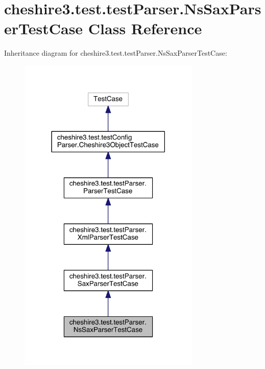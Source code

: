\hypertarget{classcheshire3_1_1test_1_1test_parser_1_1_ns_sax_parser_test_case}{\section{cheshire3.\-test.\-test\-Parser.\-Ns\-Sax\-Parser\-Test\-Case Class Reference}
\label{classcheshire3_1_1test_1_1test_parser_1_1_ns_sax_parser_test_case}
}


Inheritance diagram for cheshire3.\-test.\-test\-Parser.\-Ns\-Sax\-Parser\-Test\-Case\-:
\nopagebreak
\begin{figure}[H]
\begin{center}
\leavevmode
\includegraphics[width=246pt]{classcheshire3_1_1test_1_1test_parser_1_1_ns_sax_parser_test_case__inherit__graph}
\end{center}
\end{figure}


